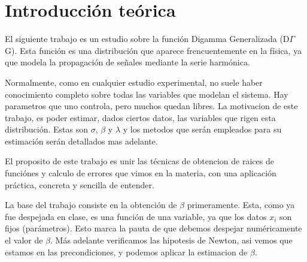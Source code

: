 \section{Introducci\'on te\'orica}

El siguiente trabajo es un estudio sobre la funci\'on Digamma Generalizada (D$\Gamma$G). Esta funci\'on es una
distribuci\'on que aparece frencuentemente en la f\'isica, ya que modela la propagaci\'on de se\~nales mediante la
serie harm\'onica.

Normalmente, como en cualquier estudio experimental, no suele haber conocimiento completo sobre todas las variables
que modelan el sistema. Hay parametros que uno controla, pero muchos quedan libres. La motivacion de este trabajo,
es poder estimar, dados ciertos datos, las variables que rigen esta distribuci\'on. Estas son $\sigma$, $\beta$ y $\lambda$
y los metodos que ser\'an empleados para su estimaci\'on ser\'an detallados mas adelante.

El proposito de este trabajo es unir las t\'ecnicas de obtencion de raices de funci\'ones y calculo de errores
que vimos en la materia, con una aplicaci\'on pr\'actica, concreta y sencilla de entender.

La base del trabajo consiste en la obtenci\'on de $\beta$ primeramente. Esta, como ya fue despejada en clase, es una funci\'on
de una variable, ya que los datos $x_i$ son fijos (par\'ametros). Esto marca la pauta de que debemos despejar num\'ericamente el
valor de $\beta$. M\'as adelante verificamos las hipotesis de Newton, asi vemos que estamos en las precondiciones,
y podemos aplicar la estimacion de $\beta$.